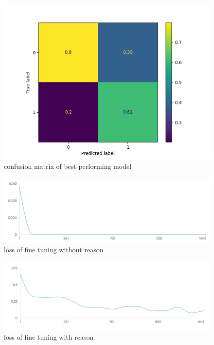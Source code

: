 \documentclass[11pt,english]{report}
\begin{document}
\begin{figure}[H]
\caption{confusion matrix of best performing model}
\centering
\includegraphics[width=13cm]{Results/Figures/confusion_matrix.png}
\end{figure}

\begin{figure}[H]
\caption{loss of fine tuning without reason}
\centering
\includegraphics[width=17cm]{Results/Figures/no_reason_1000.png}
\end{figure}

\begin{figure}[H]
\caption{loss of fine tuning with reason}
\centering
\includegraphics[width=17cm]{Results/Figures/with_reason_1000.png}
\end{figure}

\newpage



\begin{appendices}
\end{appendices}
\end{document}

